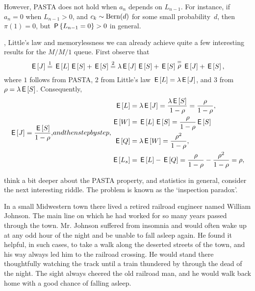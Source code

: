 \documentclass[stochastic-or.tex]{subfiles}
\begin{document}
However, PASTA does not hold when $a_{n}$ depends on $L_{n-1}$. For instance, if $a_{n}=0$ when $L_{n-1}>0$, and $c_{k}\sim \Bern{d}$ for some small probability~$d$, then $\pi(1) = 0$, but $\P{L_{n-1}=0} > 0$ in general.


, Little's law and memorylessness we can already achieve quite a few interesting results for the $M/M/1$ queue.
First observe that
\begin{equation*}
 \E\J \stackrel 1 = \E \L \E S + \E S \stackrel 2= \lambda \E \J \E S + \E S \stackrel= \rho \E \J + \E S,
\end{equation*}
where $1$ follows from PASTA, 2 from Little's law $\E L = \lambda \E J$, and 3 from $\rho=\lambda\E S$.
Consequently,
\begin{subequations}
\begin{align}
 \E\J = \frac{\E S}{1-\rho},
\end{align}
and then step by step,
\begin{align}
 \E \L &= \lambda \E\J = \frac{\lambda \E S}{1-\rho} = \frac\rho{1-\rho}, \\
 \E{\W} &= \E L \E S = \frac{\rho}{1-\rho} \E S \label{eq:wqes}\\
 \E{\QQ} &= \lambda \E{\W} = \frac{\rho^2}{1-\rho}, \\
 \E{\Ls} &= \E \L - \E{\QQ} = \frac{\rho}{1-\rho} - \frac{\rho^2}{1-\rho} = \rho,
\end{align}
\end{subequations}


 think a bit deeper about the PASTA property, and statistics in general, consider the next interesting riddle.
The problem is known as the `inspection paradox'.

In a small Midwestern town
 there lived a retired railroad engineer named William
Johnson.
The main line on which he had worked for so many years passed through the
town. Mr. Johnson suffered from insomnia and would often wake up at any odd hour of
the night and be unable to fall asleep again. He found it helpful, in such cases, to take a
walk along the deserted streets of the town, and his way always led him to the railroad
crossing. He would stand there thoughtfully watching the track until a train thundered by
through the dead of the night. The sight always cheered the old railroad man, and he
would walk back home with a good chance of falling asleep.
\end{document}
